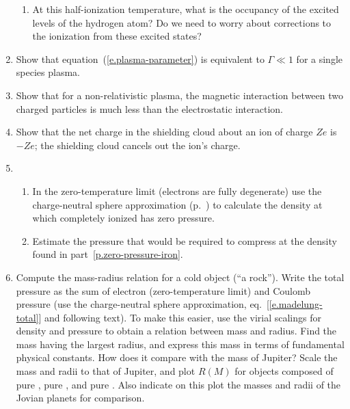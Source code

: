 \begin{enumerate}
\begin{enumerate}
\item At this half-ionization temperature, what is the occupancy of the excited levels of the hydrogen atom?  Do we need to worry about corrections to the ionization from these excited states?
\end{enumerate}

\item Show that equation~(\ref{e.plasma-parameter}) is equivalent to $\Gamma \ll 1$ for a single species plasma.

\item Show that for a non-relativistic plasma, the magnetic interaction between two charged particles is much less than the electrostatic interaction.

\item Show that the net charge in the shielding cloud about an ion of charge $Ze$ is $-Ze$; the shielding cloud cancels out the ion's charge.

\item 
\begin{enumerate} 
\item\label{p.zero-pressure-iron} In the zero-temperature limit (electrons are fully degenerate) use the charge-neutral sphere approximation (p.~\pageref{e.madelung-total}) to calculate the density at which completely ionized \iron[56] has zero pressure.

\item\label{p.compress-iron} Estimate the pressure that would be required to compress \iron[56] at the density found in part~\ref{p.zero-pressure-iron}.
\end{enumerate}

\item Compute the mass-radius relation for a cold object (``a rock''). Write the total pressure as the sum of electron (zero-temperature limit) and Coulomb pressure (use the charge-neutral sphere approximation, eq.~[\ref{e.madelung-total}] and following text).  To make this easier, use the virial scalings for density and pressure to obtain a relation between mass and radius.  Find the mass having the largest radius, and express this mass in terms of fundamental physical constants.  How does it compare with the mass of Jupiter?  Scale the mass and radii to that of Jupiter, and plot $R(M)$ for objects composed of pure \hydrogen, pure \helium, and pure \carbon.  Also indicate on this plot the masses and radii of the Jovian planets for comparison.

\end{enumerate}
